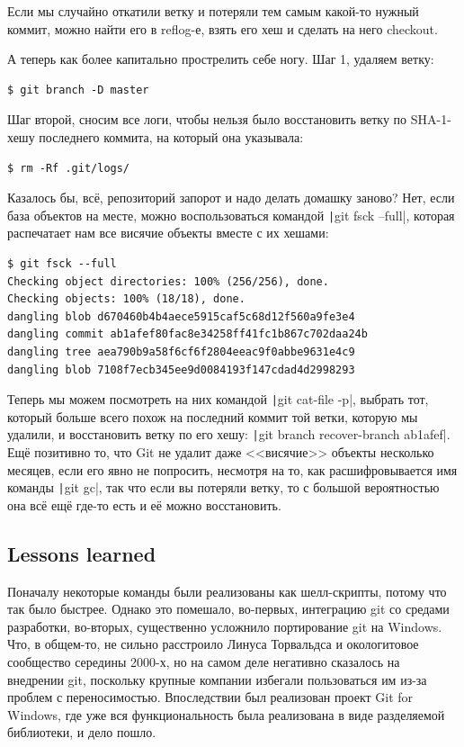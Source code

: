 \documentclass[a5paper]{article}
\begin{document}
Если мы случайно откатили ветку и потеряли тем самым какой-то нужный коммит, можно найти его в reflog-е, взять его хеш и сделать на него checkout.

А теперь как более капитально прострелить себе ногу. Шаг 1, удаляем ветку:

\begin{verbatim}
$ git branch -D master
\end{verbatim}

Шаг второй, сносим все логи, чтобы нельзя было восстановить ветку по SHA-1-хешу последнего коммита, на который она указывала:

\begin{verbatim}
$ rm -Rf .git/logs/
\end{verbatim}

Казалось бы, всё, репозиторий запорот и надо делать домашку заново? Нет, если база объектов на месте, можно воспользоваться командой \texttt|git fsck --full|, которая распечатает нам все висячие объекты вместе с их хешами:

\begin{verbatim}
$ git fsck --full
Checking object directories: 100% (256/256), done.
Checking objects: 100% (18/18), done.
dangling blob d670460b4b4aece5915caf5c68d12f560a9fe3e4
dangling commit ab1afef80fac8e34258ff41fc1b867c702daa24b
dangling tree aea790b9a58f6cf6f2804eeac9f0abbe9631e4c9
dangling blob 7108f7ecb345ee9d0084193f147cdad4d2998293
\end{verbatim}

Теперь мы можем посмотреть на них командой \texttt|git cat-file -p|, выбрать тот, который больше всего похож на последний коммит той ветки, которую мы удалили, и восстановить ветку по его хешу: \texttt|git branch recover-branch ab1afef|. Ещё позитивно то, что Git не удалит даже <<висячие>> объекты несколько месяцев, если его явно не попросить, несмотря на то, как расшифровывается имя команды \texttt|git gc|, так что если вы потеряли ветку, то с большой вероятностью она всё ещё где-то есть и её можно восстановить.

\subsection{Lessons learned}

Поначалу некоторые команды были реализованы как шелл-скрипты, потому что так было быстрее. Однако это помешало, во-первых, интеграцию git со средами разработки, во-вторых, существенно усложнило портирование git на Windows. Что, в общем-то, не сильно расстроило Линуса Торвальдса и окологитовое сообщество середины 2000-х, но на самом деле негативно сказалось на внедрении git, поскольку крупные компании избегали пользоваться им из-за проблем с переносимостью. Впоследствии был реализован проект Git for Windows, где уже вся функциональность была реализована в виде разделяемой библиотеки, и дело пошло.
\end{document}
